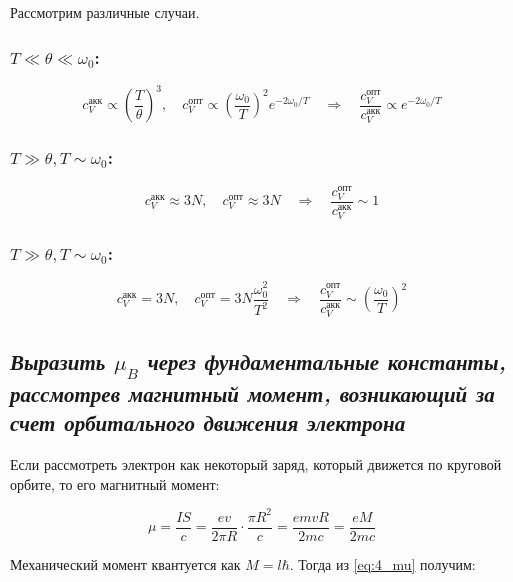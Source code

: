 \documentclass[a4paper, 12pt]{article}
\newcommand{\qrq}
{\ensuremath{\quad \Rightarrow \quad}} %
\begin{document}
Рассмотрим различные случаи.

\subsubsection{$T \ll \theta \ll \omega_0$:}

\begin{equation}
	c_V^{\text{акк}} \propto \left(\frac{T}{\theta}\right)^3, \quad c_V^{\text{опт}} \propto \left(\frac{\omega_0}{T}\right)^2 e^{-2 \omega_0 / T} \qrq \frac{c_V^{\text{опт}}}{c_V^{\text{акк}}} \propto e^{-2\omega_0 / T}
\end{equation}

\subsubsection{$T \gg \theta, T \sim \omega_0$:}

\begin{equation}
	c_V^{\text{акк}} \approx 3N, \quad c_V^{\text{опт}} \approx 3N \qrq \frac{c_V^{\text{опт}}}{c_V^{\text{акк}}} \sim 1
\end{equation}

\subsubsection{$T \gg \theta, T \sim \omega_0$:}

\begin{equation}
	c_V^{\text{акк}} = 3 N, \quad c_V^{\text{опт}} = 3N \frac{\omega_0^2}{T^2} \qrq \frac{c_V^{\text{опт}}}{c_V^{\text{акк}}} \sim \left(\frac{\omega_0}{T}\right)^2
\end{equation}

\subsection{\textit{Выразить $\mu_B$ через фундаментальные константы, рассмотрев магнитный момент, возникающий за счет орбитального движения электрона}}

Если рассмотреть электрон как некоторый заряд, который движется по круговой орбите, то его магнитный момент:

\begin{equation}
	\mu = \frac{I S}{c} = \frac{e v}{2 \pi R} \cdot \frac{\pi R^ 2}{c} = \frac{e m v R}{2 m c} = \frac{e M}{2 m c}
	\label{eq:4_mu}
\end{equation}

Механический момент квантуется как $M = l \hbar$. Тогда из \ref{eq:4_mu} получим:
\end{document}
